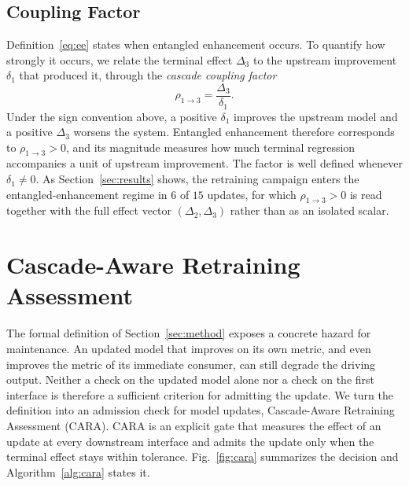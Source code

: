 \documentclass[conference]{IEEEtran}
\begin{document}
\subsection{Coupling Factor}
\label{sec:diag}
Definition~\eqref{eq:ee} states when entangled enhancement occurs. To quantify how
strongly it occurs, we relate the terminal effect $\Delta_3$ to the upstream
improvement $\delta_1$ that produced it, through the \emph{cascade coupling
factor}
\begin{equation}
\rho_{1\to 3} = \frac{\Delta_3}{\delta_1}.
\label{eq:rho-def}
\end{equation}
Under the sign convention above, a positive $\delta_1$ improves the upstream model
and a positive $\Delta_3$ worsens the system. Entangled enhancement therefore
corresponds to $\rho_{1\to 3} > 0$, and its magnitude measures how much terminal
regression accompanies a unit of upstream improvement. The factor is well defined whenever
$\delta_1 \neq 0$. As Section~\ref{sec:results} shows, the retraining campaign
enters the entangled-enhancement regime in $6$ of $15$ updates, for which
$\rho_{1\to 3} > 0$ is read together with the full effect vector
$(\Delta_2, \Delta_3)$ rather than as an isolated scalar.

\section{Cascade-Aware Retraining Assessment}
\label{sec:cara}
The formal definition of Section~\ref{sec:method} exposes a concrete hazard for
maintenance. An updated model that improves on its own metric, and even improves
the metric of its immediate consumer, can still degrade the driving output.
Neither a check on the updated model alone nor a check on the first interface is
therefore a sufficient criterion for admitting the update. We turn the definition
into an admission check for model updates, Cascade-Aware Retraining Assessment
(CARA). CARA is an explicit gate that measures the effect of an update at every
downstream interface and admits the update only when the terminal effect stays
within tolerance. Fig.~\ref{fig:cara} summarizes the decision and
Algorithm~\ref{alg:cara} states it.
\end{document}
